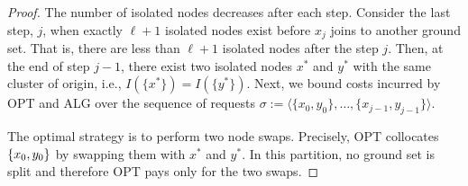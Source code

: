 \documentclass[a4paper,anonymous,USenglish]{lipics-v2019}
\newcommand{\OPT}{\textsc{OPT}\xspace}
\newcommand{\ALG}{\textsc{ALG}\xspace}
\DeclarePairedDelimiter\set{\{}{\}}
\begin{document}
\begin{proof}
	
	The number of isolated nodes decreases after each step.
	Consider the last step, $j$, when exactly $\ell+1$ isolated nodes exist before  $x_{j}$ joins to another ground set.
	That is, there are less than $\ell+1$ isolated nodes after the step $j$.
	Then, at the end of step $j-1$,
	there exist two isolated nodes $x^*$ and $y^*$
	with the same cluster of origin, i.e., $I(\{x^*\})=I(\{y^*\})$.
%
   Next,
    we bound costs incurred by \OPT and \ALG over the  sequence of requests
    $\sigma := \langle \{x_0,y_0\}, \dots, \{x_{j-1},y_{j-1}\}  \rangle$.

	The optimal strategy is to perform two node swaps.
	Precisely, \OPT collocates $\set{x_0,y_0}$ 
	by swapping them with $x^*$ and $y^*$.
	In this partition, no ground set is split and
	therefore \OPT pays only for the two swaps.


\end{proof}
\end{document}

